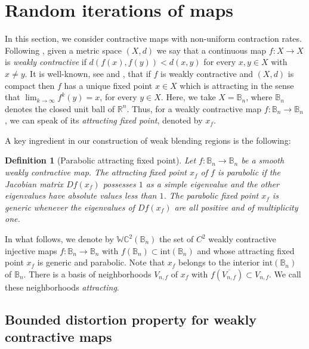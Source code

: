\documentclass[11pt,reqno]{amsart}
\theoremstyle{plain}
\newtheorem{definition}[theorem]{Definition}
\newtheorem*{theorem A}{Theorem A}
\newtheorem*{theorem B}{Theorem B}
\newtheorem*{theorem C}{Theorem C}
\newtheorem*{theorem 1}{Theorem 1}
\newtheorem*{theorem 2}{Theorem 2}
\newtheorem*{theorem 3}{Theorem 3}
\numberwithin{equation}{section}
\begin{document}

\section{Random iterations of maps}\label{s2}

In this section, we consider contractive maps with non-uniform contraction rates.
Following \cite{alber1997principle}, given a metric space $(X,d)$ we say that a continuous map $f\colon X \to X$ is \emph{weakly contractive} if $d(f(x),f(y)) < d(x,y)$ for every $x,y \in X$ with $x\neq y$.
It is well-known, see \cite[Coro.~3]{jager2003quasiperiodically} and \cite{bielecki1995iterated}, that if $f$ is weakly contractive and $(X,d)$ is compact then $f$ has a unique fixed point $x \in X$ which is attracting in the sense that $\lim_{k \to \infty}f^k(y)=x$, for every $y \in X$.
Here, we take $X=\mathbb{B}_n$, where $\mathbb{B}_n$ denotes the closed unit ball of $\mathbb{R}^n$.
Thus, for a weakly contractive map $f \colon \mathbb{B}_n \to \mathbb{B}_n$, we can speak of its \emph{attracting fixed point}, denoted by $x_f$.

A key ingredient in our construction of weak blending regions is the following:

\begin{definition}[Parabolic attracting fixed point]
Let $f\colon \mathbb{B}_n \to \mathbb{B}_n$ be a smooth weakly contractive map.
The attracting fixed point $x_f$ of $f$ is \emph{parabolic} if the Jacobian matrix $Df(x_f)$ possesses $1$ as a simple eigenvalue and the other eigenvalues have absolute values less than $1$.
The parabolic fixed point $x_f$ is \emph{generic} whenever the eigenvalues of $Df(x_f)$ are all positive and of multiplicity one.
\end{definition}

In what follows, we denote by $\mathbb{WC}^2 ( \mathbb{B}_n)$ the set of $C^2$ weakly contractive injective maps $f\colon \mathbb{B}_n \to \mathbb{B}_n$ with $f(\mathbb{B}_n)\subset \text{int}(\mathbb{B}_n)$ and whose attracting fixed point $x_f$ is generic and parabolic.
Note that $x_f$ belongs to the interior $\text{int}(\mathbb{B}_n)$ of $\mathbb{B}_n$.
There is a basis of neighborhoods $V_{n,f}$ of $x_f$ with $f(\overline{V_{n,f}}) \subset V_{n,f}$.
We call these neighborhoods \emph{attracting}.

\subsection{Bounded distortion property for weakly contractive maps}
\end{document}
